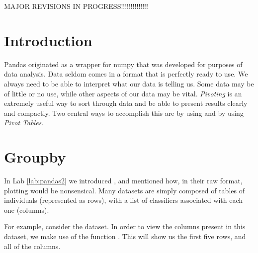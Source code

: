 \label{lab:pandas3}

MAJOR REVISIONS IN PROGRESS!!!!!!!!!!!!!!

\section*{Introduction}
Pandas originated as a wrapper for numpy that was developed for purposes of data analysis. Data seldom comes in a format that is perfectly ready to use.  We always need to be able to interpret what our data is telling us.  Some data may be of little or no use, while other aspects of our data may be vital.  \emph{Pivoting} is an extremely useful way to sort through data and be able to present results clearly and compactly.  Two central ways to accomplish this are by using  and by using \emph{Pivot Tables}.

\section*{Groupby}

In Lab \ref{lab:pandas2} we introduced , and mentioned how, in their raw format, plotting would be nonsensical.  Many datasets are simply composed of tables of individuals (represented as rows), with a list of classifiers associated with each one (columns).

For example, consider the  dataset.  In order to view the columns present in this dataset, we make use of the function .  This will show us the first five rows, and all of the columns.


